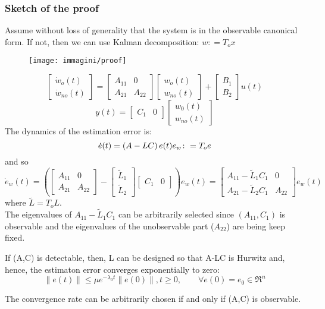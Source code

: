 \subsubsection{Sketch of the proof}
Assume without loss of generality that the system is in the observable canonical form. If not, then we can use Kalman decomposition:  $w\colon=T_ox$
\begin{figure}[H]
	\centering
	\texttt{[image: immagini/proof]}
	\label{fig:proof}
\end{figure}
\[\begin{bmatrix}
	\dot{w}_o(t)\\
	\dot{w}_{no}(t)
\end{bmatrix}
=\begin{bmatrix}
	A_{11} & 0\\A_{21} & A_{22}
\end{bmatrix}\begin{bmatrix}
w_o(t)\\w_{no}(t)
\end{bmatrix}
+\begin{bmatrix}
	B_1\\B_2
\end{bmatrix}u(t)
\]
\[
y(t)=\begin{bmatrix}
	C_1 & 0
\end{bmatrix}\begin{bmatrix}
w_0(t)\\w_{no}(t)
\end{bmatrix}
\]
The dynamics of the estimation error is:
\[
\dot{e}(t)=\left(A-LC\right)e(t)\\
e_w\colon=T_oe
\]
and so
\[
\dot{e}_w(t)=\left( \begin{bmatrix}
	A_{11} & 0\\A_{21} & A_{22}
\end{bmatrix}-\begin{bmatrix}
	\tilde{L}_1 \\ \tilde{L}_2
\end{bmatrix} \begin{bmatrix}
C_1 & 0
\end{bmatrix}\right) e_w(t)=\begin{bmatrix}
	\boxed{A_{11}-\tilde{L}_1C_1} & 0\\
	A_{21}-\tilde{L}_2C_1 & \boxed{A_{22}}
\end{bmatrix} e_w(t)
\]
where $\tilde{L}=T_oL$.\\
The eigenvalues of $A_{11}-\tilde{L}_1C_1$ can be arbitrarily selected since $\left( A_{11},C_1\right)$ is observable and the eigenvalues of the unobservable part ($A_{22}$) are being keep fixed.
\begin{thm}
	If (A,C) is detectable, then, L can be designed so that A-LC is Hurwitz and, hence, the estimaton error converges exponentially to zero:
	\[
		\|e(t)\| \le \mu e^{-\lambda_0t}\|e(0)\|, t\ge 0, \qquad \forall e(0)=e_0 \in \Re^n
	\]
\end{thm}
\begin{remark}
	The convergence rate can be arbitrarily chosen if and only if (A,C) is observable.
\end{remark}
